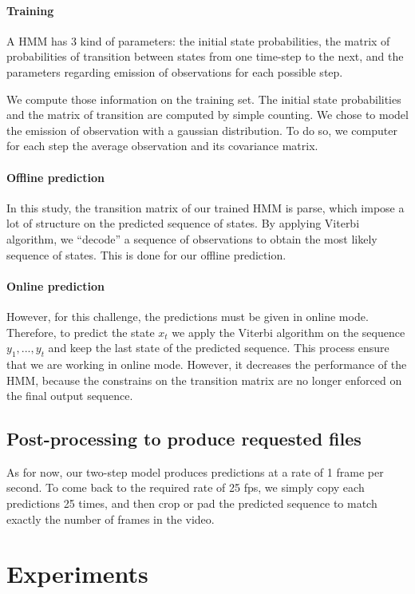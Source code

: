 \documentclass[10pt,twocolumn,letterpaper]{article}
\begin{document}
\paragraph{Training} A HMM has 3 kind of parameters: the initial state probabilities, the matrix of probabilities
of transition between states from one time-step to the next, and the parameters
regarding emission of observations for each possible step.

We compute those information on the training set. The initial state probabilities and the matrix of transition are computed by simple counting. We chose to model the emission of
observation with a gaussian distribution. To do so, we computer for each step the average observation and its covariance matrix.

\paragraph{Offline prediction} In this study, the transition matrix of our trained HMM is parse, which impose a lot of structure on the predicted sequence of states. By applying Viterbi algorithm, we ``decode'' a sequence of observations to obtain the most likely sequence of states. This is done for our offline prediction.

\paragraph{Online prediction} However, for this challenge, the predictions must
be given in online mode. Therefore, to predict the state
$x_t$ we apply the Viterbi algorithm on the sequence $y_1,...,y_t$ and keep the
last state of the predicted sequence. This process ensure that we are working in online
mode. However, it decreases the performance of the HMM, because the constrains on the transition
matrix are no longer enforced on the final output sequence.

\subsection{Post-processing to produce requested files}

As for now, our two-step model produces predictions at a rate of 1 frame per second. To come
back to the required rate of 25 fps, we simply copy each predictions 25 times, and
then crop or pad the predicted sequence to match exactly the number of frames in
the video.

\section{Experiments}
\end{document}
